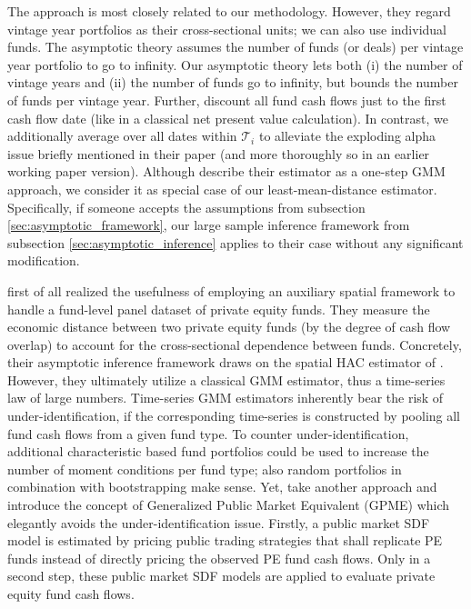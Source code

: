 \documentclass[12pt]{article}
\begin{document}
The \cite{DLP12} approach is most closely related to our methodology.
However, they regard vintage year portfolios as their cross-sectional units; we can also use individual funds.
The \cite{DLP12} asymptotic theory assumes the number of funds (or deals) per vintage year portfolio to go to infinity.
Our asymptotic theory lets both (i) the number of vintage years and (ii) the number of funds go to infinity, but bounds the number of funds per vintage year.
Further, \cite{DLP12} discount all fund cash flows just to the first cash flow date (like in a classical net present value calculation).
In contrast, we additionally average over all dates within $\mathcal{T}_{i}$ to alleviate the exploding alpha issue briefly mentioned in their paper (and more thoroughly so in an earlier working paper version).
Although \cite{DLP12} describe their estimator as a one-step GMM approach, we consider it as special case of our least-mean-distance estimator.
Specifically, if someone accepts the assumptions from subsection \ref{sec:asymptotic_framework}, our large sample inference framework from subsection \ref{sec:asymptotic_inference} applies to their case without any significant modification.

\cite{KN16} first of all realized the usefulness of employing an auxiliary spatial framework to handle a fund-level panel dataset of private equity funds.
They measure the economic distance between two private equity funds (by the degree of cash flow overlap) to account for the cross-sectional dependence between funds.
Concretely, their asymptotic inference framework draws on the spatial HAC estimator of \cite{C99}.
However, they ultimately utilize a classical GMM estimator, thus a time-series law of large numbers.
Time-series GMM estimators inherently bear the risk of under-identification, if the corresponding time-series is constructed by pooling all fund cash flows from a given fund type.
To counter under-identification, additional characteristic based fund portfolios could be used to increase the number of moment conditions per fund type; also random portfolios in combination with bootstrapping make sense.
Yet, \cite{KN16} take another approach and introduce the concept of Generalized Public Market Equivalent (GPME) which elegantly avoids the under-identification issue.
Firstly, a public market SDF model is estimated by pricing public trading strategies that shall replicate PE funds instead of directly pricing the observed PE fund cash flows.
Only in a second step, these public market SDF models are applied to evaluate private equity fund cash flows.
\end{document}
